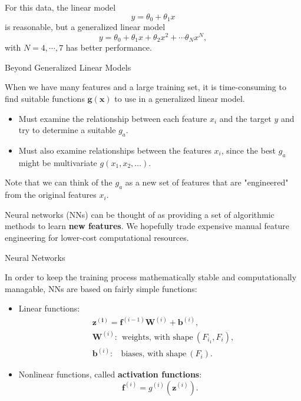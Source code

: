 \documentclass[12pt,t]{beamer}
\begin{document}
\begin{frame}

For this data, the linear model
$$ y = \theta_0 +  \theta_1 x$$
is reasonable, but a generalized linear model 
$$ y = \theta_0 +  \theta_1 x + \theta_2 x^2 + \cdots \theta_N x^N, $$
with $ N = 4, \cdots, 7$ has better performance.

\end{frame}

\begin{frame}{Beyond Generalized Linear Models}

 When  we have many features and a large training set, it is time-consuming to find suitable functions $ \bm{g}( \mathbf{x} )$ to use in a generalized linear model.

\begin{itemize}
\item Must examine the relationship between each feature $x_i$ and the target $y$ and try to determine a suitable $g_a$.
\item Must also examine relationships between the features $x_i$, since the best $g_a$ might be multivariate $g(x_1, x_2,\ldots)$.
\end{itemize}

Note that we can think of the $g_a$ as a new set of features that are "engineered" from the original features $x_i$.

\bigskip
Neural networks (NNs) can be thought of as providing a set of algorithmic methods to learn {\bf new features}.  We hopefully trade expensive manual feature engineering for lower-cost computational  resources. 
\end{frame}

\begin{frame}{Neural Networks}


In order to keep the training process mathematically stable and computationally managable, NNs are based on fairly simple functions:
\begin{itemize}
\item Linear functions:
\begin{equation*} \begin{split}
&  \mathbf{z^{(i)}} = \mathbf{f}^{(i-1)} \mathbf{W}^{(i)} + \mathbf{b}^{(i)}, \\
&  \mathbf{W}^{(i)}: ~~\text{weights, with shape}~(F_{i_1}, F_i), \\
&   \mathbf{b}^{(i)}:~~~~\text{biases, with shape}~( F_i).
\end{split} \end{equation*}
\item Nonlinear functions, called {\bf activation functions}:
$$ \mathbf{f}^{(i)} = g^{(i)}(\mathbf{z}^{(i)}).$$
\end{itemize}
\end{frame}
\end{document}
